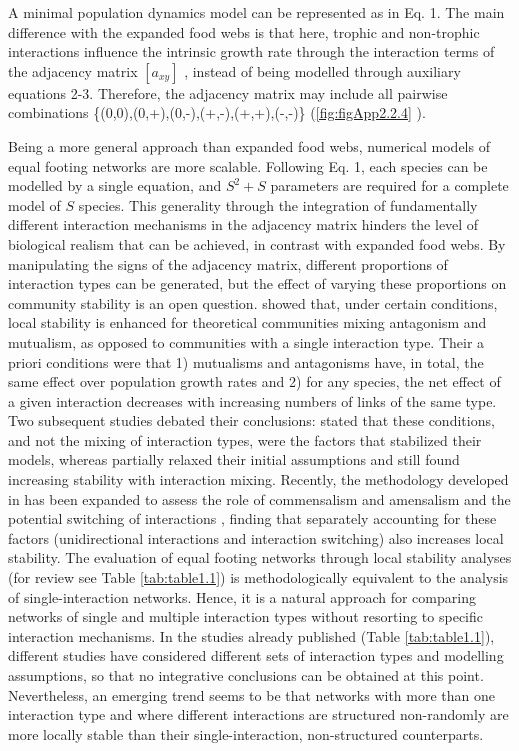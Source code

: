 A minimal population dynamics model can be represented as in Eq. 1. The main difference with the expanded food webs is that here, trophic and non-trophic interactions influence the intrinsic growth rate through the interaction terms of the adjacency matrix  $\left[a_{\mathit{xy}}\right]$  , instead of being modelled through auxiliary equations 2-3. Therefore, the adjacency matrix may include all pairwise combinations \{(0,0),(0,+),(0,-),(+,-),(+,+),(-,-)\} (\cref{fig:figApp2.2.4} ).

Being a more general approach than expanded food webs, numerical models of equal footing networks are more scalable. Following Eq. 1, each species can be modelled by a single equation, and  $S^2+S$ parameters are required for a complete model of  $S$ species. This generality through the integration of fundamentally different interaction mechanisms in the adjacency matrix hinders the level of biological realism that can be achieved, in contrast with expanded food webs. By manipulating the signs of the adjacency matrix, different proportions of interaction types can be generated, but the effect of varying these proportions on community stability is an open question. \cite{Mougi2012} showed that, under certain conditions, local stability is enhanced for theoretical communities mixing antagonism and mutualism, as opposed to communities with a single interaction type. Their a priori conditions were that 1) mutualisms and antagonisms have, in total, the same effect over population growth rates and 2) for any species, the net effect of a given interaction decreases with increasing numbers of links of the same type. Two subsequent studies debated their conclusions: \cite{Suweis2014} stated that these conditions, and not the mixing of interaction types, were the factors that stabilized their models, whereas \cite{Kondoh2015} partially relaxed their initial assumptions and still found increasing stability with interaction mixing. Recently, the methodology developed in \cite{Mougi2012} has been expanded to assess the role of commensalism and amensalism \citep{Mougi2016a} and the potential switching of interactions \citep{Mougi2016b}, finding that separately accounting for these factors (unidirectional interactions and interaction switching) also increases local stability. The evaluation of equal footing networks through local stability analyses (for review see Table \ref{tab:table1.1}) is methodologically equivalent to the analysis of single-interaction networks. Hence, it is a natural approach for comparing networks of single and multiple interaction types without resorting to specific interaction mechanisms. In the studies already published (Table \ref{tab:table1.1}), different studies have considered different sets of interaction types and modelling assumptions, so that no integrative conclusions can be obtained at this point. Nevertheless, an emerging trend seems to be that networks with more than one interaction type and where different interactions are structured non-randomly are more locally stable than their single-interaction, non-structured counterparts.

